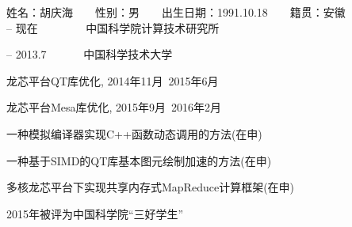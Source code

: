 \begin{resume}

\noindent
姓名：胡庆海　　性别：男　　出生日期：1991.10.18　　籍贯：安徽\\

 -- 现在　　　　  中国科学院计算技术研究所

 -- 2013.7　　　  中国科学技术大学\\

  \begin{enumerate}[{[}1{]}]
  \item 龙芯平台QT库优化, 2014年11月~2015年6月
  \item 龙芯平台Mesa库优化, 2015年9月~2016年2月 
  \end{enumerate}

  \begin{enumerate}[{[}1{]}]
  \item  一种模拟编译器实现C++函数动态调用的方法(在申)
  \item  一种基于SIMD的QT库基本图元绘制加速的方法(在申)
  \item  多核龙芯平台下实现共享内存式MapReduce计算框架(在申)
  \end{enumerate}

  \begin{enumerate}[{[}1{]}]
  \item  2015年被评为中国科学院“三好学生”
  \end{enumerate}
\end{resume}
